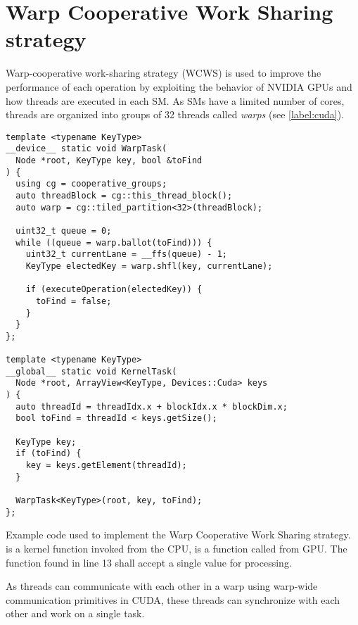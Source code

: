 \section{Warp Cooperative Work Sharing strategy}\label{section:wcws}

Warp-cooperative work-sharing strategy (WCWS) is used to improve the performance of each operation by exploiting the behavior of NVIDIA GPUs and how threads are executed in each SM. As SMs have a limited number of cores, threads are organized into groups of 32 threads called \textit{warps} (see \cref{label:cuda}).

\begin{listing}
  \begin{verbatim}
template <typename KeyType>
__device__ static void WarpTask(
  Node *root, KeyType key, bool &toFind
) {
  using cg = cooperative_groups;
  auto threadBlock = cg::this_thread_block();
  auto warp = cg::tiled_partition<32>(threadBlock);

  uint32_t queue = 0;
  while ((queue = warp.ballot(toFind))) {
    uint32_t currentLane = __ffs(queue) - 1;
    KeyType electedKey = warp.shfl(key, currentLane);

    if (executeOperation(electedKey)) {
      toFind = false;
    }
  }
};

template <typename KeyType>
__global__ static void KernelTask(
  Node *root, ArrayView<KeyType, Devices::Cuda> keys
) {
  auto threadId = threadIdx.x + blockIdx.x * blockDim.x;
  bool toFind = threadId < keys.getSize();

  KeyType key;
  if (toFind) {
    key = keys.getElement(threadId);
  }

  WarpTask<KeyType>(root, key, toFind);
};
  \end{verbatim}
  \caption{Example code used to implement the Warp Cooperative Work Sharing strategy.  is a kernel function invoked from the CPU,  is a function called from GPU. The  function found in line 13 shall accept a single value for processing.}
  \label{lst:wcws}
\end{listing}

As threads can communicate with each other in a warp using warp-wide communication primitives in CUDA, these threads can synchronize with each other and work on a single task.

